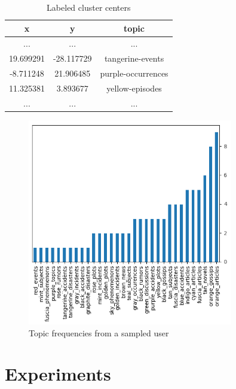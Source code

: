 \documentclass[ecp,tc,english]{iiufrgs}
\begin{document}
        
        \begin{table}[H]
            \centering
                \begin{tabular}{ |c|c|c| } 
                \hline
                x & y & topic \\
                \hline 
                ... & ...  & ... \\
                19.699291 & -28.117729 & tangerine-events \\ 
                -8.711248 & 21.906485 & purple-occurrences \\ 
                11.325381 & 3.893677 & yellow-episodes \\ 
                ... & ...  & ...  \\
                \hline
                \end{tabular}
            \caption{Labeled cluster centers}
            \label{tab:labeled_clusters}
        \end{table}
        
        \begin{figure}[H]
            \centering
            \includegraphics[width=0.8\textwidth]{images/benford.png}
            \caption{Topic frequencies from a sampled user}
            \label{fig:benford}
        \end{figure}


\chapter{Experiments} \label{experiments}  
\end{document}
